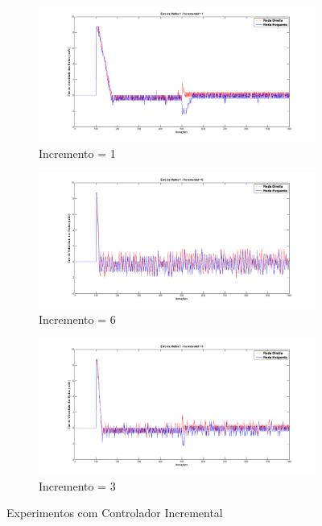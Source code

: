 \begin{figure}[!htb]
	\centering
	\begin{subfigure}{.5\textwidth}
		\centering
		\includegraphics[width=.9\linewidth]{./Testes/Malha1/Incremental/Malha1_Inc1}
		\caption{Incremento = 1}
		\label{fig:contInc1}
	\end{subfigure}%
	\begin{subfigure}{.5\textwidth}
		\centering
		\includegraphics[width=.9\linewidth]{./Testes/Malha1/Incremental/Malha1_Inc6}
		\caption{Incremento = 6}
		\label{fig:contInc6}
	\end{subfigure}
	\begin{subfigure}{1.0\textwidth}
		\centering
		\includegraphics[width=.9\linewidth]{./Testes/Malha1/Incremental/Malha1_Inc3}
		\caption{Incremento = 3}
		\label{fig:contInc3}
	\end{subfigure}
	\caption{Experimentos com Controlador Incremental}
	\label{fig:contInc}
\end{figure}

